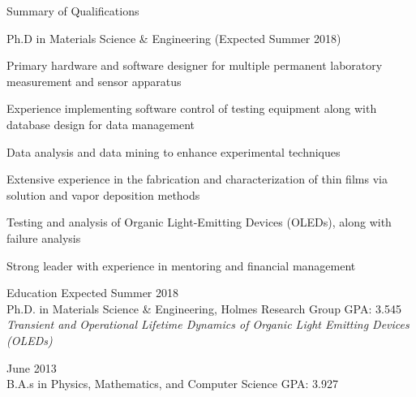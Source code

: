 \documentclass{resume} %
\begin{document}

\begin{rSection}{Summary of Qualifications}
\item Ph.D in Materials Science \& Engineering (Expected Summer 2018)
\item Primary hardware and software designer for multiple permanent laboratory measurement and sensor apparatus
\item Experience implementing software control of testing equipment along with database design for data management 
\item Data analysis and data mining to enhance experimental techniques
\item Extensive experience in the fabrication and characterization of thin films via solution and vapor deposition methods
\item Testing and analysis of Organic Light-Emitting Devices (OLEDs), along with failure analysis
\item Strong leader with experience in mentoring and financial management 


\end{rSection}


\begin{rSection}{Education}
\hspace{-.5em}{\bf University of Minnesota} \hfill { Expected Summer 2018} \\
Ph.D. in Materials Science \& Engineering, Holmes Research Group \hfill GPA: 3.545\\
{\em Transient and Operational Lifetime Dynamics of Organic Light Emitting Devices (OLEDs)}\vspace{-1ex}

\hspace{-.5em}{\bf Coe College} \hfill { June 2013} \\ 
B.A.s in Physics, Mathematics, and Computer Science \hfill GPA: 3.927
\end{rSection}
\end{document}

